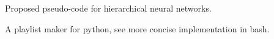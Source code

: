 

Proposed pseudo-code for hierarchical neural networks.

A playlist maker for python, see more concise implementation in bash.

